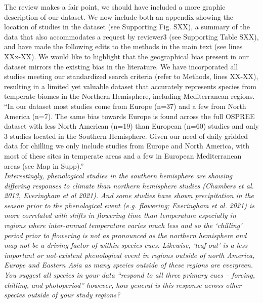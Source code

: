 \documentclass[11pt]{article}
\begin{document}

The review makes a fair point, we should have included a more graphic description of our dataset. We now include both an appendix showing the location of studies in the dataset (see Supporting Fig. SXX), a summary of the data that also accommodates a request by reviewer3 (see Supporting Table SXX), and have made the following edits to the methods in the main text (see lines XXx-XX). We would like to highlight that the geographical bias present in our dataset mirrors the existing bias in the literature. We have incorporated all studies meeting our standardized search criteria (refer to Methods, lines XX-XX), resulting in a limited yet valuable dataset that accurately represents species from temperate biomes in the Northern Hemisphere, including Mediterranean regions.\\

``In our dataset most studies come from Europe (n=37) and a few from North America (n=7). The same bias towards Europe is found across the full OSPREE dataset with less North American (n=19) than European (n=60) studies and only 3 studies located in the Southern Hemisphere. Given our need of daily gridded data for chilling we only include studies from Europe and North America, with most of these sites in temperate areas and a few in European Mediterranean areas (see Map in Supp).''\\

\emph{Interestingly, phenological studies in the southern hemisphere are showing differing responses to climate than northern hemisphere studies (Chambers et al. 2013, Everingham et al 2021). And some studies have shown precipitation in the season prior to the phenological event (e.g. flowering; Everingham et al. 2021) is more correlated with shifts in flowering time than temperature especially in regions where inter-annual temperature varies much less and so the ‘chilling’ period prior to flowering is not as pronounced as the northern hemisphere and may not be a driving factor of within-species cues. Likewise, ‘leaf-out’ is a less important or not-existent phenological event in regions outside of north America, Europe and Eastern Asia as many species outside of these regions are evergreen. You suggest all species in your data “respond to all three primary cues – forcing, chilling, and photoperiod” however, how general is this response across other species outside of your study regions?}\\
\end{document}

